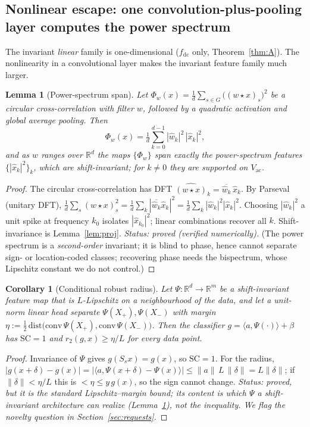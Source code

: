 \documentclass[11pt]{article}
\theoremstyle{plain}
\newtheorem{lemma}{Lemma}
\newtheorem{corollary}{Corollary}
\theoremstyle{definition}
\theoremstyle{remark}
\newcommand{\R}{\mathbb{R}}
\newcommand{\fdc}{f_{\mathrm{dc}}}
\newcommand{\Vac}{V_{\mathrm{ac}}}
\begin{document}
\subsection{Nonlinear escape: one convolution-plus-pooling layer computes the power spectrum}
The invariant \emph{linear} family is one-dimensional ($\fdc$ only, Theorem~\ref{thm:A}). The nonlinearity in a convolutional layer makes the invariant feature family much larger.
\begin{lemma}[Power-spectrum span]\label{lem:ps}
Let $\Phi_w(x)=\tfrac1d\sum_{s\in G}\big((w\star x)_s\big)^2$ be a circular cross-correlation with filter $w$, followed by a quadratic activation and global average pooling. Then
\[
\Phi_w(x)=\tfrac1d\sum_{k=0}^{d-1}|\hat w_k|^2\,|\hat x_k|^2,
\]
and as $w$ ranges over $\R^d$ the maps $\{\Phi_w\}$ span exactly the power-spectrum features $\{|\hat x_k|^2\}_k$, which are shift-invariant; for $k\neq0$ they are supported on $\Vac$.
\end{lemma}
\begin{proof}
The circular cross-correlation has DFT $\widehat{(w\star x)}_k=\overline{\hat w_k}\,\hat x_k$. By Parseval (unitary DFT), $\tfrac1d\sum_s (w\star x)_s^2=\tfrac1d\sum_k|\overline{\hat w_k}\hat x_k|^2=\tfrac1d\sum_k|\hat w_k|^2|\hat x_k|^2$. Choosing $|\hat w_k|^2$ a unit spike at frequency $k_0$ isolates $|\hat x_{k_0}|^2$; linear combinations recover all $k$. Shift-invariance is Lemma~\ref{lem:proj}. \emph{Status: proved (verified numerically).} (The power spectrum is a \emph{second-order} invariant; it is blind to phase, hence cannot separate sign- or location-coded classes; recovering phase needs the bispectrum, whose Lipschitz constant we do not control.)
\end{proof}

\begin{corollary}[Conditional robust radius]\label{cor:radius}
Let $\Psi:\R^d\to\R^m$ be a shift-invariant feature map that is $L$-Lipschitz on a neighbourhood of the data, and let a unit-norm linear head separate $\Psi(X_+),\Psi(X_-)$ with margin $\eta:=\tfrac12\,\mathrm{dist}\big(\mathrm{conv}\,\Psi(X_+),\mathrm{conv}\,\Psi(X_-)\big)$. Then the classifier $g=\langle a,\Psi(\cdot)\rangle+\beta$ has $\mathrm{SC}=1$ and $r_2(g,x)\ge\eta/L$ for every data point.
\end{corollary}
\begin{proof}
Invariance of $\Psi$ gives $g(S_sx)=g(x)$, so $\mathrm{SC}=1$. For the radius, $|g(x+\delta)-g(x)|=|\langle a,\Psi(x+\delta)-\Psi(x)\rangle|\le\|a\|\,L\,\|\delta\|=L\|\delta\|$; if $\|\delta\|<\eta/L$ this is $<\eta\le y\,g(x)$, so the sign cannot change. \emph{Status: proved, but it is the standard Lipschitz--margin bound; its content is which $\Psi$ a shift-invariant architecture can realize (Lemma~\ref{lem:ps}), not the inequality. We flag the novelty question in Section~\ref{sec:requests}.}
\end{proof}
\end{document}
